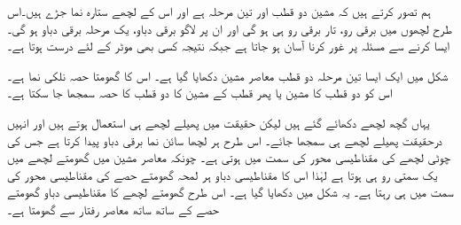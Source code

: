  ہم تصور کرتے ہیں کہ مشین دو قطب اور تین مرحلہ ہے اور اس کے لچھے ستارہ نما جڑے  ہیں۔اس طرح لچھوں میں برقی رو، تار برقی رو ہی ہو گی اور ان پر لاگو برقی دباو، یک مرحلہ برقی دباو ہو گی۔ایسا کرنے سے مسئلہ پر غور کرنا آسان ہو جاتا ہے جبکہ نتیجہ کسی بھی موٹر کے لئے درست ہوتا ہے۔

شکل   میں ایک ایسا تین مرحلہ دو قطب معاصر مشین دکھایا گیا ہے۔ اس کا گھومتا حصہ نلکی نما ہے۔اس کو دو قطب کا مشین یا پھر  قطب کے مشین کا دو قطب کا حصہ سمجھا جا سکتا ہے۔

 یہاں گچھ لچھے دکھائے گئے ہیں لیکن حقیقت میں پھیلے لچھے ہی استعمال ہوتے ہیں اور انہیں درحقیقت پھیلے لچھے ہی سمجھا جائے۔ اس طرح ہر لچھا سائن نما برقی دباو پیدا کرتا ہے جس کی چوٹی لچھے کی مقناطیسی محور کی سمت میں ہوتی ہے۔  چونکہ معاصر مشین میں گھومتے لچھے میں یک سمتی رو ہی ہوتا ہے لہٰذا اس کا مقناطیسی دباو ہر لمحہ گھومتے حصے کی مقناطیسی محور کی سمت میں ہی رہتا ہے۔ یہ شکل میں دکھایا گیا ہے۔ اس طرح گھومتے لچھے کا مقناطیسی دباو گھومتے حصے کے ساتھ ساتھ معاصر رفتار سے گھومتا ہے۔

